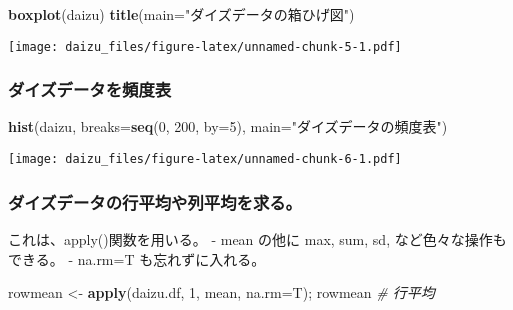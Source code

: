 \documentclass[]{article}
\newenvironment{Shaded}{\begin{snugshade}}{\end{snugshade}}
\newcommand{\CommentTok}[1]{\textcolor[rgb]{0.56,0.35,0.01}{\textit{#1}}}
\newcommand{\DataTypeTok}[1]{\textcolor[rgb]{0.13,0.29,0.53}{#1}}
\newcommand{\DecValTok}[1]{\textcolor[rgb]{0.00,0.00,0.81}{#1}}
\newcommand{\KeywordTok}[1]{\textcolor[rgb]{0.13,0.29,0.53}{\textbf{#1}}}
\newcommand{\NormalTok}[1]{#1}
\newcommand{\StringTok}[1]{\textcolor[rgb]{0.31,0.60,0.02}{#1}}
\begin{document}
\begin{Shaded}
\begin{Highlighting}[]
    \KeywordTok{boxplot}\NormalTok{(daizu)}
    \KeywordTok{title}\NormalTok{(}\DataTypeTok{main=}\StringTok{"ダイズデータの箱ひげ図"}\NormalTok{)}
\end{Highlighting}
\end{Shaded}

\texttt{[image: daizu\_files/figure-latex/unnamed-chunk-5-1.pdf]}

\hypertarget{ux30c0ux30a4ux30baux30c7ux30fcux30bfux3092ux983bux5ea6ux8868}{%
\subsubsection{ダイズデータを頻度表}\label{ux30c0ux30a4ux30baux30c7ux30fcux30bfux3092ux983bux5ea6ux8868}}

\begin{Shaded}
\begin{Highlighting}[]
    \KeywordTok{hist}\NormalTok{(daizu, }\DataTypeTok{breaks=}\KeywordTok{seq}\NormalTok{(}\DecValTok{0}\NormalTok{, }\DecValTok{200}\NormalTok{, }\DataTypeTok{by=}\DecValTok{5}\NormalTok{), }\DataTypeTok{main=}\StringTok{"ダイズデータの頻度表"}\NormalTok{)}
\end{Highlighting}
\end{Shaded}

\texttt{[image: daizu\_files/figure-latex/unnamed-chunk-6-1.pdf]}

\hypertarget{ux30c0ux30a4ux30baux30c7ux30fcux30bfux306eux884cux5e73ux5747ux3084ux5217ux5e73ux5747ux3092ux6c42ux308b}{%
\subsubsection{ダイズデータの行平均や列平均を求る。}\label{ux30c0ux30a4ux30baux30c7ux30fcux30bfux306eux884cux5e73ux5747ux3084ux5217ux5e73ux5747ux3092ux6c42ux308b}}

これは、apply()関数を用いる。 - mean の他に max, sum, sd,
など色々な操作もできる。 - na.rm=T も忘れずに入れる。

\begin{Shaded}
\begin{Highlighting}[]
\NormalTok{    rowmean <-}\StringTok{ }\KeywordTok{apply}\NormalTok{(daizu.df, }\DecValTok{1}\NormalTok{, mean, }\DataTypeTok{na.rm=}\NormalTok{T); rowmean       }\CommentTok{# 行平均}
\end{Highlighting}
\end{Shaded}
\end{document}
